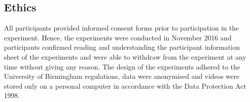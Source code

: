 \documentclass[fleqn,10pt]{wlscirep}
\begin{document}
\subsection*{Ethics}
All participants provided informed consent forms prior to participation 
in the experiment. Hence, the experiments were conducted in November 2016 and 
participants confirmed reading and understanding the participant information sheet of the 
experiments and were able to withdraw from the experiment at any time without giving
any reason. The design of the experiments adhered to the University of Birmingham
regulations, data were anonymised and videos were stored only on a 
personal computer in accordance with the Data Protection Act 1998. 
\end{document}
